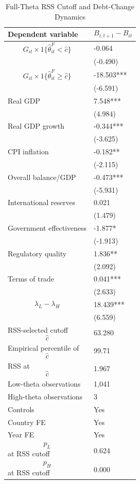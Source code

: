 \begin{table}[H]\centering
\begin{threeparttable}
\caption{Full-Theta RSS Cutoff and Debt-Change Dynamics}
\label{tab:deltaB_rss_cutoff_fulltheta}
\scriptsize
\begin{tabularx}{\textwidth}{lY}
\toprule
Dependent variable & $$B_{i,t+1}-B_{it}$$ \\
\midrule
$$G_{it}\times 1\{\widehat{\theta}^{F}_{it}<\widehat{c}\}$$ & -0.064 \\
 & (-0.490) \\
$$G_{it}\times 1\{\widehat{\theta}^{F}_{it}\geq\widehat{c}\}$$ & -18.503*** \\
 & (-6.591) \\
Real GDP & 7.548*** \\
 & (4.984) \\
Real GDP growth & -0.344*** \\
 & (-3.625) \\
CPI inflation & -0.182** \\
 & (-2.115) \\
Overall balance/GDP & -0.473*** \\
 & (-5.931) \\
International reserves & 0.021 \\
 & (1.479) \\
Government effectiveness & -1.877* \\
 & (-1.913) \\
Regulatory quality & 1.836** \\
 & (2.092) \\
Terms of trade & 0.041*** \\
 & (2.633) \\
$$\lambda_L-\lambda_H$$ & 18.439*** \\
 & (6.559) \\
\midrule
RSS-selected cutoff $$\widehat{c}$$ & 63.280 \\
Empirical percentile of $$\widehat{c}$$ & 99.71 \\
RSS at $$\widehat{c}$$ & 1.967 \\
Low-theta observations & 1,041 \\
High-theta observations & 3 \\
Controls & Yes \\
Country FE & Yes \\
Year FE & Yes \\
$$p_L$$ at RSS cutoff & 0.624 \\
$$p_H$$ at RSS cutoff & 0.000 \\

\end{tabularx}
\end{threeparttable}
\end{table}
